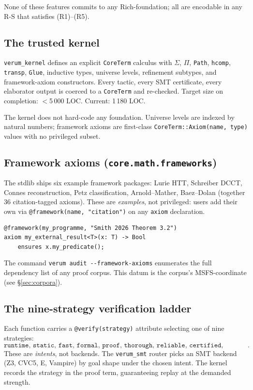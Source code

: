 \documentclass[11pt, a4paper]{article}
\theoremstyle{definition}
\theoremstyle{remark}
\begin{document}
None of these features commits to any Rich-foundation; all are encodable in any R-S that satisfies (R1)--(R5).

\subsection{The trusted kernel}
\label{subsec:kernel}

\texttt{verum\_kernel} defines an explicit \texttt{CoreTerm} calculus with $\Sigma$, $\Pi$, \texttt{Path}, \texttt{hcomp}, \texttt{transp}, \texttt{Glue}, inductive types, universe levels, refinement subtypes, and framework-axiom constructors. Every tactic, every SMT certificate, every elaborator output is coerced to a \texttt{CoreTerm} and re-checked. Target size on completion: $<$5\,000 LOC. Current: 1\,180 LOC.

The kernel does not hard-code any foundation. Universe levels are indexed by natural numbers; framework axioms are first-class \texttt{CoreTerm::Axiom(name, type)} values with no privileged subset.

\subsection{Framework axioms (\texttt{core.math.frameworks})}
\label{subsec:framework-axioms}

The stdlib ships six example framework packages: Lurie HTT, Schreiber DCCT, Connes reconstruction, Petz classification, Arnold--Mather, Baez--Dolan (together 36 citation-tagged axioms). These are \emph{examples}, not privileged: users add their own via \texttt{@framework(name, "citation")} on any \texttt{axiom} declaration.

\begin{lstlisting}[caption={User-defined framework axiom.}]
@framework(my_programme, "Smith 2026 Theorem 3.2")
axiom my_external_result<T>(x: T) -> Bool
    ensures x.my_predicate();
\end{lstlisting}

The command \verb|verum audit --framework-axioms| enumerates the full dependency list of any proof corpus. This datum is the corpus's MSFS-coordinate (see \S\ref{sec:corpora}).

\subsection{The nine-strategy verification ladder}
\label{subsec:verification-ladder}

Each function carries a \texttt{@verify(strategy)} attribute selecting one of nine strategies:
\[
\texttt{runtime, static, fast, formal, proof, thorough, reliable, certified, synthesize}.
\]
These are \emph{intents}, not backends. The \texttt{verum\_smt} router picks an SMT backend (Z3, CVC5, E, Vampire) by goal shape under the chosen intent. The kernel records the strategy in the proof term, guaranteeing replay at the demanded strength.
\end{document}
